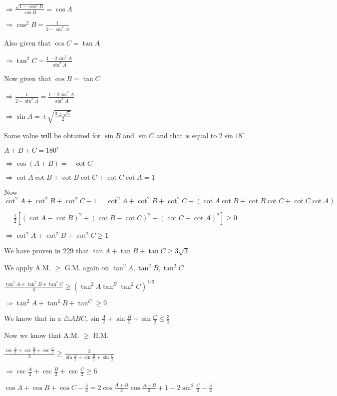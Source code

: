   $\Rightarrow \frac{\sqrt{1 - \cos^2B}}{\cos B} = \cos A$

  $\Rightarrow \cos^2B = \frac{1}{2 - \sin^2A}$

  Also given that $\cos C = \tan A$

  $\Rightarrow \tan^2 C = \frac{1 - 2\sin^2A}{\sin^2A}$

  Now given that $\cos B = \tan C$

  $\Rightarrow \frac{1}{2 - \sin^2A} = \frac{1 - 2\sin^2A}{\sin^2A}$

  $\Rightarrow \sin A = \pm\sqrt{\frac{3\pm\sqrt{5}}{2}}$

  Same value will be obtained for $\sin B$ and $\sin C$ and that is equal to $2\sin 18^\circ$

\item $A + B + C = 180^\circ$

  $\Rightarrow \cos(A + B) = -\cot C$

  $\Rightarrow \cot A\cot B + \cot B\cot C + \cot C\cot A = 1$

  Now $\cot^2A + \cot^2B + \cot^2C - 1 = \cot^2A + \cot^2B + \cot^2C - (\cot A\cot B + \cot B\cot C + \cot C\cot A)$

  $= \frac{1}{2}[(\cot A - \cot B)^2 + (\cot B - \cot C)^2 + (\cot C - \cot A)^2] \geq 0$

  $\Rightarrow \cot^2A + \cot^2B + \cot^2C \geq 1$

\item We have proven in 229 that $\tan A + \tan B + \tan C \geq 3\sqrt{3}$

  We apply A.M. $\geq$ G.M. again on $\tan^2A, \tan^2B, \tan^2C$

  $\frac{\tan^2A + \tan^2B + \tan^2C}{3}\geq (\tan^2A\tan^B\tan^2C)^{1/3}$

  $\Rightarrow \tan^2A + \tan^2B + \tan^C \geq 9$

\item We know that in a $\triangle ABC, \sin\frac{A}{2} + \sin\frac{B}{2} + \sin\frac{C}{2} \leq \frac{3}{2}$

  Now we know that A.M. $\geq$ H.M.

  $\frac{\csc\frac{A}{2} + \csc\frac{B}{2} + \csc\frac{C}{2}}{3}\geq \frac{3}{\sin\frac{A}{2} + \sin\frac{B}{2} + \sin\frac{C}{2}}$

  $\Rightarrow \csc\frac{A}{2} + \csc\frac{B}{2} + \csc\frac{C}{2} \geq 6$

\item $\cos A + \cos B + \cos C -\frac{3}{2} = 2\cos\frac{A + B}{2}\cos\frac{A - B}{2} + 1 - 2\sin^2\frac{C}{2} - \frac{3}{2}$

